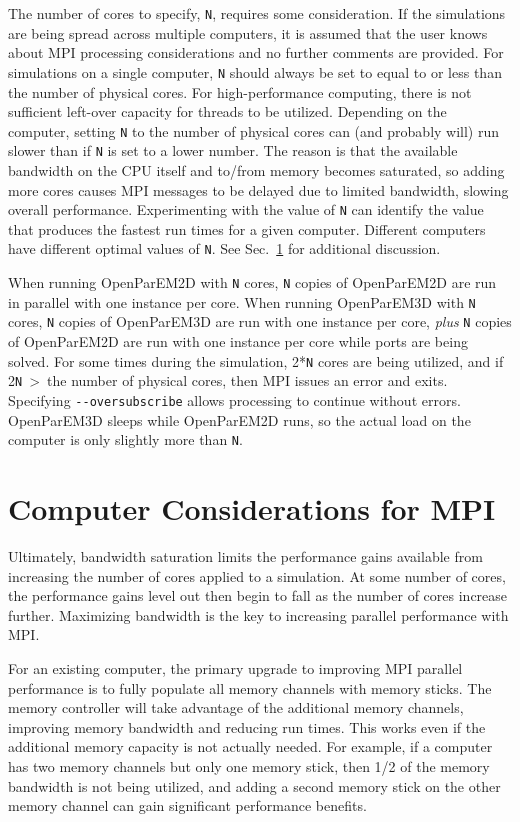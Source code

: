 \documentclass[titlepage]{article}
\renewcommand\_{\textunderscore\linebreak[1]}
\begin{document}
The number of cores to specify, \verb+N+, requires some consideration.  If the simulations are being spread across multiple computers, it is assumed that the user knows about MPI processing considerations and no further comments are provided.  For simulations on a single computer, \verb+N+ should always be set to equal to or less than the number of physical cores.  For high-performance computing, there is not sufficient left-over capacity for threads to be utilized.  Depending on the computer, setting \verb+N+ to the number of physical cores can (and probably will) run slower than if \verb+N+ is set to a lower number.  The reason is that the available bandwidth on the CPU itself and to/from memory becomes saturated, so adding more cores causes MPI messages to be delayed due to limited bandwidth, slowing overall performance.  Experimenting with the value of \verb+N+ can identify the value that produces the fastest run times for a given computer.  Different computers have different optimal values of \verb+N+.  See Sec.~\ref{sec:computer} for additional discussion.

When running OpenParEM2D with \verb+N+ cores, \verb+N+ copies of OpenParEM2D are run in parallel with one instance per core.  When running OpenParEM3D with \verb+N+ cores, \verb+N+ copies of OpenParEM3D are run with one instance per core, \textit{plus} \verb+N+ copies of OpenParEM2D are run with one instance per core while ports are being solved.  For some times during the simulation, 2*\verb+N+ cores are being utilized, and if 2\verb+N+~\textgreater~the number of physical cores, then MPI issues an error and exits.  Specifying \verb+--oversubscribe+ allows processing to continue without errors.  OpenParEM3D sleeps while OpenParEM2D runs, so the actual load on the computer is only slightly more than \verb+N+.

\section{Computer Considerations for MPI}
\label{sec:computer}

Ultimately, bandwidth saturation limits the performance gains available from increasing the number of cores applied to a simulation.  At some number of cores, the performance gains level out then begin to fall as the number of cores increase further.  Maximizing bandwidth is the key to increasing parallel performance with MPI.

For an existing computer, the primary upgrade to improving MPI parallel performance is to fully populate all memory channels with memory sticks.  The memory controller will take advantage of the additional memory channels, improving memory bandwidth and reducing run times.  This works even if the additional memory capacity is not actually needed.  For example, if a computer has two memory channels but only one memory stick, then 1/2 of the memory bandwidth is not being utilized, and adding a second memory stick on the other memory channel can gain significant performance benefits.
\end{document}
